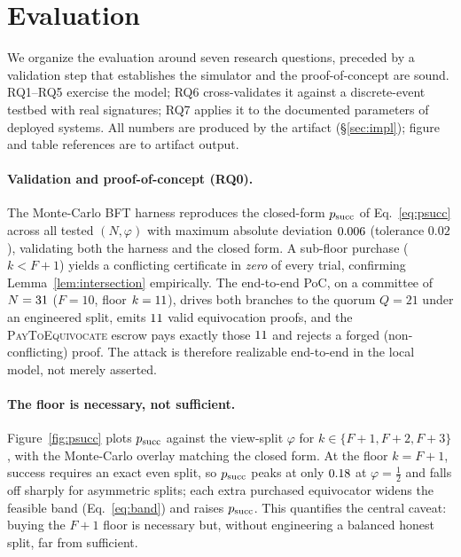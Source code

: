 \section{Evaluation}
\label{sec:eval}

We organize the evaluation around seven research questions, preceded by a validation step that
establishes the simulator and the proof-of-concept are sound. RQ1--RQ5 exercise the model; RQ6
cross-validates it against a discrete-event testbed with real signatures; RQ7 applies it to the
documented parameters of deployed systems. All numbers are produced by the artifact
(\S\ref{sec:impl}); figure and table references are to artifact output.

\paragraph{Validation and proof-of-concept (RQ0).}
The Monte-Carlo BFT harness reproduces the closed-form $p_{\mathrm{succ}}$ of Eq.~\eqref{eq:psucc} across all
tested $(N,\varphi)$ with maximum absolute deviation $0.006$ (tolerance $0.02$),
validating both the harness and the closed form. A sub-floor purchase ($k<F{+}1$) yields a conflicting
certificate in \emph{zero} of every trial, confirming Lemma~\ref{lem:intersection} empirically. The
end-to-end PoC, on a committee of $N=31$ ($F=10$, floor $k=11$), drives both
branches to the quorum $Q=21$ under an engineered split, emits $11$ valid
equivocation proofs, and the \textsc{PayToEquivocate} escrow pays exactly those $11$
and rejects a forged (non-conflicting) proof. The attack is therefore realizable end-to-end in the
local model, not merely asserted.

\paragraph{The floor is necessary, not sufficient.}
Figure~\ref{fig:psucc} plots $p_{\mathrm{succ}}$ against the view-split $\varphi$ for $k\in\{F{+}1,F{+}2,F{+}3\}$,
with the Monte-Carlo overlay matching the closed form. At the floor $k=F{+}1$, success requires an
exact even split, so $p_{\mathrm{succ}}$ peaks at only $0.18$ at $\varphi=\tfrac12$ and falls off
sharply for asymmetric splits; each extra purchased equivocator widens the feasible band
(Eq.~\eqref{eq:band}) and raises $p_{\mathrm{succ}}$. This quantifies the central caveat: buying the $F{+}1$
floor is necessary but, without engineering a balanced honest split, far from sufficient.

